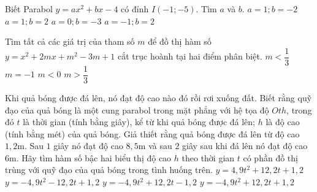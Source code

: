 \begin{ex}%
	Biết Parabol $y=ax^2+bx-4$ có đỉnh $I(-1;-5)$. Tìm $a$ và $b$.
	\choice
	{$a=1;b=-2$}
	{$a=1;b=2$}
	{$a=0;b=-3$}
	{$a=-1;b=2$}
\end{ex}

\begin{ex}%
	Tìm tất cả các giá trị của tham số $m$ để đồ thị hàm số $y=x^2+2 m x+m^2-3 m+1$ cắt trục hoành tại hai điểm phân biệt.
	\choice
	{$m<\dfrac{1}{3}$}
	{$m=-1$}
	{$m<0$}
	{\True $m>\dfrac{1}{3}$}
\end{ex}
\begin{ex}%
	Khi quả bóng được đá lên, nó đạt độ cao nào đó rồi rơi xuống đất. Biết rằng quỹ đạo của quả bóng là một cung parabol trong mặt phẳng với hệ tọa độ $Oth$, trong đó $t$ là thời gian (tính bằng giây), kể từ khi quả bóng được đá lên; $h$ là độ cao (tính bằng mét) của quả bóng. Giả thiết rằng quả bóng được đá lên từ độ cao $1{,}2$m. Sau $1$ giây nó đạt độ cao $8{,}5$m và sau $2$ giây sau khi đá lên nó đạt độ cao $6$m. Hãy tìm hàm số bậc hai biểu thị độ cao $h$ theo thời gian $t$ có phần đồ thị trùng với quỹ đạo của quả bóng trong tình huống trên.
	\choice
	{$y=4{,}9t^2+12{,}2t+1{,}2$}
	{$y=-4{,}9t^2-12{,}2t+1{,}2$}
	{$y=-4{,}9t^2+12{,}2t-1{,}2$}
	{\True $y=-4{,}9t^2+12{,}2t+1{,}2$}
\end{ex}
